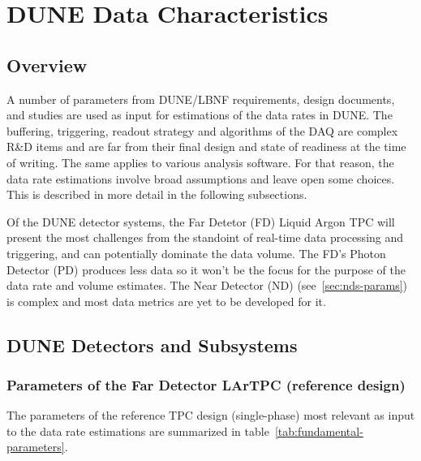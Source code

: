 \section{DUNE Data Characteristics}
\label{sec:data-characteristics}
\subsection{Overview}

A number of parameters from DUNE/LBNF requirements, design documents,  and studies are used  as input
for estimations of the data rates in DUNE.
The buffering, triggering, readout strategy and algorithms of the DAQ
are complex R\&D items and are far from their final design and state of
readiness at the time of writing.  The same applies to various analysis software.
For that reason, the data rate estimations involve broad assumptions
and leave open some choices. This is described in more detail in the following subsections.

Of the DUNE detector systems, the Far Detetor (FD) Liquid Argon TPC will present the most
challenges from the standoint of real-time data processing and triggering, and can potentially dominate the data volume.
The FD's Photon Detector (PD) produces less data so it won't be the focus
for the purpose of the data rate and volume estimates.  The Near
Detector (ND) (see~\ref{sec:nds-params}) is complex and most data metrics are yet to be developed for it.

\subsection{DUNE Detectors and Subsystems}

\subsubsection{Parameters of the Far Detector LArTPC (reference design)}
\label{sec:fundamental-parameters}

The parameters of the reference TPC design (single-phase) most relevant as input to the data rate estimations are summarized in
table~\ref{tab:fundamental-parameters}.

